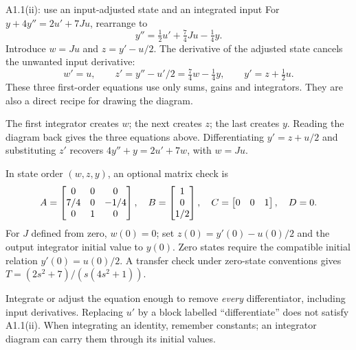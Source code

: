 \begin{method}{A1.1(ii): use an input-adjusted state and an integrated input}
For $y+4y''=2u'+7Ju$, rearrange to
\[y''=\tfrac12u'+\tfrac74Ju-\tfrac14y.\]
Introduce $w=Ju$ and $z=y'-u/2$. The derivative of the adjusted state cancels the unwanted input derivative:
\[w'=u,\qquad z'=y''-u'/2=\tfrac74w-\tfrac14y,\qquad y'=z+\tfrac12u.\]
These three first-order equations use only sums, gains and integrators. They are also a direct recipe for drawing the diagram.
\end{method}
\begin{answer}
\begin{center}
\end{center}
The first integrator creates $w$; the next creates $z$; the last creates $y$. Reading the diagram back gives the three equations above. Differentiating $y'=z+u/2$ and substituting $z'$ recovers $4y''+y=2u'+7w$, with $w=Ju$.

In state order $(w,z,y)$, an optional matrix check is
\[A=\begin{bmatrix}0&0&0\\7/4&0&-1/4\\0&1&0\end{bmatrix},\quad B=\begin{bmatrix}1\\0\\1/2\end{bmatrix},\quad C=\begin{bmatrix}0&0&1\end{bmatrix},\quad D=0.\]
For $J$ defined from zero, $w(0)=0$; set $z(0)=y'(0)-u(0)/2$ and the output integrator initial value to $y(0)$. Zero states require the compatible initial relation $y'(0)=u(0)/2$. A transfer check under zero-state conventions gives $T=(2s^2+7)/(s(4s^2+1))$.
\end{answer}
\begin{tip}
Integrate or adjust the equation enough to remove \emph{every} differentiator, including input derivatives. Replacing $u'$ by a block labelled ``differentiate'' does not satisfy A1.1(ii). When integrating an identity, remember constants; an integrator diagram can carry them through its initial values.
\end{tip}
